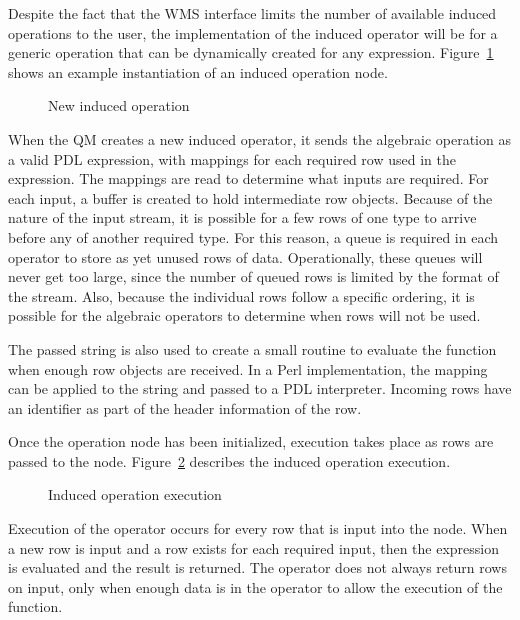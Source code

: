 \documentclass{ucdthesis}       %
\begin{document}
Despite the fact that the \ac{WMS} interface limits the number of
available induced operations to the user, the implementation of the
induced operator will be for a generic operation that can be
dynamically created for any expression.  Figure~\ref{fig:algebra-new}
shows an example instantiation of an induced operation node.

\begin{figure}[htb]
  \centering
  
  \caption{New induced operation}
  \label{fig:algebra-new}
\end{figure}

When the \ac{QM} creates a new induced operator, it sends the
algebraic operation as a valid \ac{PDL} expression, with mappings for
each required row used in the expression.  The mappings are read to
determine what inputs are required.  For each input, a buffer is
created to hold intermediate row objects.  Because of the nature of
the input stream, it is possible for a few rows of one type to arrive
before any of another required type.  For this reason, a queue is
required in each operator to store as yet unused rows of data.
Operationally, these queues will never get too large, since the number
of queued rows is limited by the format of the stream.  Also, because
the individual rows follow a specific ordering, it is possible for the
algebraic operators to determine when rows will not be used.

The passed string is also used to create a small routine to evaluate
the function when enough row objects are received.  In a Perl
implementation, the mapping can be applied to the string and passed to
a \ac{PDL} interpreter.  Incoming rows have an identifier as part of
the header information of the row.

Once the operation node has been initialized, execution takes place as
rows are passed to the node.  Figure~\ref{fig:algebra-ex}
describes the induced operation execution.

\begin{figure}[htb]
  \centering
  
  \caption{Induced operation execution}
  \label{fig:algebra-ex}
\end{figure}

Execution of the operator occurs for every row that is input into
the node.  When a new row is input and a row exists for each
required input, then the expression is evaluated and the result is
returned.  The operator does not always return rows on input, only
when enough data is in the operator to allow the execution of the
function.
\end{document}
